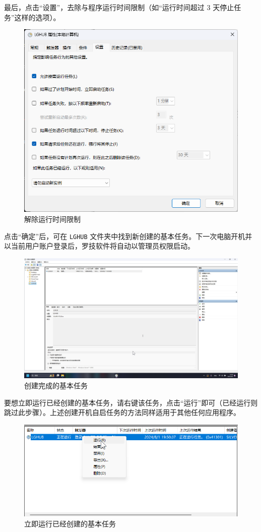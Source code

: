 最后，点击“设置”，去除与程序运行时间限制（如“运行时间超过 3 天停止任务”这样的选项）。

\begin{figure}[H]
    \Centering
    \includegraphics[width=\textwidth]{docs/assets/skills/create_basic_task_10.png}
    \caption{解除运行时间限制}
\end{figure}

点击“确定”后，可在 \lstinline{LGHUB} 文件夹中找到新创建的基本任务。下一次电脑开机并以当前用户账户登录后，罗技软件将自动以管理员权限启动。

\begin{figure}[H]
    \Centering
    \includegraphics[width=\textwidth]{docs/assets/skills/create_basic_task_11.png}
    \caption{创建完成的基本任务}
\end{figure}

要想立即运行已经创建的基本任务，请右键该任务，点击“运行”即可（已经运行则跳过此步骤）。上述创建开机自启任务的方法同样适用于其他任何应用程序。

\begin{figure}[H]
    \Centering
    \includegraphics[width=\textwidth]{docs/assets/skills/run_task.png}
    \caption{立即运行已经创建的基本任务}
\end{figure}
